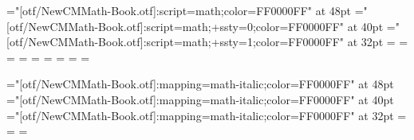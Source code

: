 \font\1="[otf/NewCMMath-Book.otf]:script=math;color=FF0000FF" at 48pt
\font\2="[otf/NewCMMath-Book.otf]:script=math;+ssty=0;color=FF0000FF" at 40pt
\font\3="[otf/NewCMMath-Book.otf]:script=math;+ssty=1;color=FF0000FF" at 32pt
=\1 =\2 =\3
=\1 =\2 =\3
=\1 =\2 =\3
\def\rm{\fam=0}
\def\cal{\fam=2}

\font\1="[otf/NewCMMath-Book.otf]:mapping=math-italic;color=FF0000FF" at 48pt
\font\2="[otf/NewCMMath-Book.otf]:mapping=math-italic;color=FF0000FF" at 40pt
\font\3="[otf/NewCMMath-Book.otf]:mapping=math-italic;color=FF0000FF" at 32pt
=\1 =\2 =\3
\def\mit{\fam=1}
